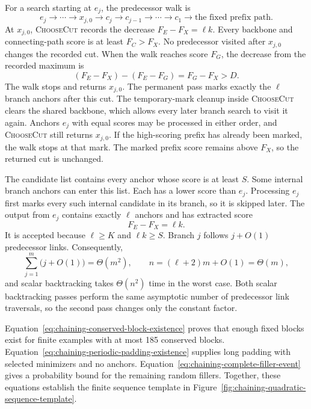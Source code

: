 For a search starting at \(e_j\), the predecessor walk is
\[
  e_j\to\cdots\to x_{j,0}\to c_j\to c_{j-1}\to\cdots\to c_1
  \to\text{the fixed prefix path}.
\]
At \(x_{j,0}\), \textsc{ChooseCut} records the decrease
\(F_E-F_X=\ell k\). Every backbone and connecting-path score is at least
\(F_C>F_X\). No predecessor visited after \(x_{j,0}\) changes the recorded
cut. When the walk reaches score
\(F_G\), the decrease from the recorded maximum is
\[
  (F_E-F_X)-(F_E-F_G)=F_G-F_X>D.
\]
The walk stops and returns \(x_{j,0}\). The permanent pass marks exactly the
\(\ell\) branch anchors after this cut. The temporary-mark cleanup inside
\textsc{ChooseCut} clears the shared backbone, which allows every later branch
search to visit it again. Anchors \(e_j\) with equal scores may be processed
in either order, and \textsc{ChooseCut} still returns \(x_{j,0}\). If the
high-scoring prefix has already been marked,
the walk stops at that mark. The marked prefix score remains above \(F_X\), so
the returned cut is unchanged.

The candidate list contains every anchor whose score is at least \(S\). Some
internal branch anchors can enter this list. Each has a lower score than
\(e_j\). Processing \(e_j\) first marks every such internal candidate in its
branch, so it is skipped later. The output from \(e_j\) contains exactly
\(\ell\) anchors and has extracted score
\[
  F_E-F_X=\ell k.
\]
It is accepted because \(\ell\geq K\) and \(\ell k\geq S\). Branch \(j\)
follows \(j+O(1)\) predecessor links.
Consequently,
\begin{equation}
  \sum_{j=1}^{m}\bigl(j+O(1)\bigr)=\Theta(m^2),
  \qquad
  n=(\ell+2)m+O(1)=\Theta(m),
  \label{eq:chaining-quadratic-retained-anchor-bound}
\end{equation}
and scalar backtracking takes \(\Theta(n^2)\) time in the worst case. Both
scalar backtracking passes perform the same asymptotic number of predecessor
link traversals, so the second pass changes only the constant factor.

Equation~\ref{eq:chaining-conserved-block-existence} proves that enough fixed
blocks exist for finite examples with at most 185 conserved blocks.
Equation~\ref{eq:chaining-periodic-padding-existence} supplies long padding
with selected minimizers and no anchors.
Equation~\ref{eq:chaining-complete-filler-event} gives a probability bound for
the remaining random fillers. Together, these equations establish the finite
sequence template in Figure~\ref{fig:chaining-quadratic-sequence-template}.


